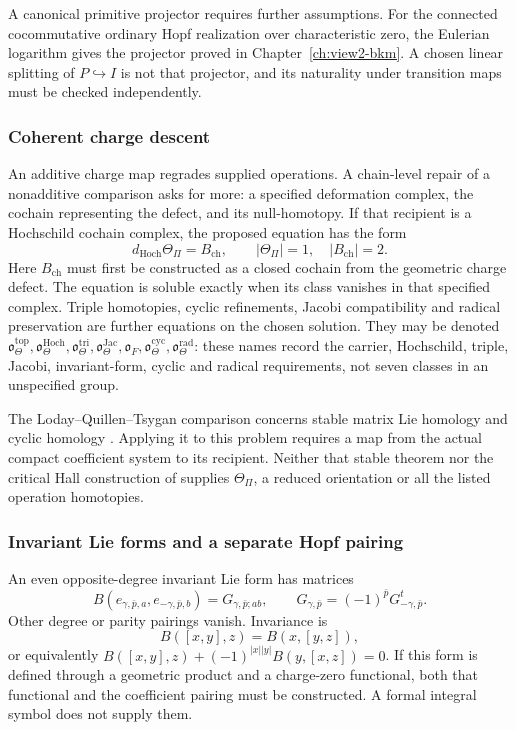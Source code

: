 A canonical primitive projector requires further assumptions.
For the connected cocommutative ordinary Hopf realization over
characteristic zero, the Eulerian logarithm gives the projector
proved in Chapter~\ref{ch:view2-bkm}. A chosen linear splitting
of \(P\hookrightarrow I\) is not that projector, and its
naturality under transition maps must be checked independently.

\subsubsection*{Coherent charge descent}

An additive charge map regrades supplied operations. A chain-level
repair of a nonadditive comparison asks for more: a specified
deformation complex, the cochain representing the defect, and its
null-homotopy. If that recipient is a Hochschild cochain complex,
the proposed equation has the form
\[
 d_{\mathrm{Hoch}}\Theta_\Pi=B_{\mathrm{ch}},
 \qquad |\Theta_\Pi|=1,\quad |B_{\mathrm{ch}}|=2.
\]
Here \(B_{\mathrm{ch}}\) must first be constructed as a closed
cochain from the geometric charge defect. The equation is soluble
exactly when its class vanishes in that specified complex.
Triple homotopies, cyclic refinements, Jacobi compatibility and
radical preservation are further equations on the chosen solution.
They may be denoted
\(\mathfrak o_\Theta^{\mathrm{top}},
\mathfrak o_\Theta^{\mathrm{Hoch}},
\mathfrak o_\Theta^{\mathrm{tri}},
\mathfrak o_\Theta^{\mathrm{Jac}},\mathfrak o_F,
\mathfrak o_\Theta^{\mathrm{cyc}},
\mathfrak o_\Theta^{\mathrm{rad}}\): these names record the
carrier, Hochschild, triple, Jacobi, invariant-form, cyclic and
radical requirements, not seven classes in an unspecified group.

The Loday--Quillen--Tsygan comparison concerns stable matrix Lie
homology and cyclic homology
\cite{LodayQuillen1984,Tsygan1983,LodayCyclicHomology}. Applying
it to this problem requires a map from the actual compact
coefficient system to its recipient. Neither that stable theorem
nor the critical Hall construction of \cite{KSCoHA} supplies
\(\Theta_\Pi\), a reduced orientation or all the listed
operation homotopies.

\subsubsection*{Invariant Lie forms and a separate Hopf pairing}

An even opposite-degree invariant Lie form has matrices
\[
 B(e_{\gamma,\bar p,a},e_{-\gamma,\bar p,b})
       =G_{\gamma,\bar p;ab},\qquad
 G_{\gamma,\bar p}=(-1)^{\bar p}G_{-\gamma,\bar p}^{t}.
\]
Other degree or parity pairings vanish. Invariance is
\[
 B([x,y],z)=B(x,[y,z]),
\]
or equivalently
\(B([x,y],z)+(-1)^{|x||y|}B(y,[x,z])=0\).
If this form is defined through a geometric product and a
charge-zero functional, both that functional and the coefficient
pairing must be constructed. A formal integral symbol does not
supply them.

